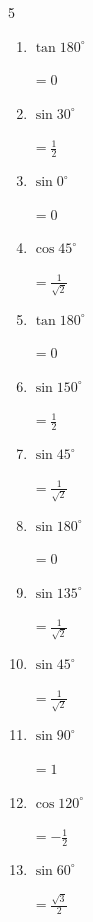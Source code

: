 \begin{multicols}{5}
\begin{enumerate}
  \item $\displaystyle \tan{180^\circ}$

        $\displaystyle =0$

  \item $\displaystyle \sin{30^\circ}$

        $\displaystyle =\frac{1}{2}$

  \item $\displaystyle \sin{0^\circ}$

        $\displaystyle =0$

  \item $\displaystyle \cos{45^\circ}$

        $\displaystyle =\frac{1}{\sqrt{2}}$

  \item $\displaystyle \tan{180^\circ}$

        $\displaystyle =0$

\columnbreak %

  \item $\displaystyle \sin{150^\circ}$

        $\displaystyle =\frac{1}{2}$

  \item $\displaystyle \sin{45^\circ}$

        $\displaystyle =\frac{1}{\sqrt{2}}$

  \item $\displaystyle \sin{180^\circ}$

        $\displaystyle =0$

  \item $\displaystyle \sin{135^\circ}$

        $\displaystyle =\frac{1}{\sqrt{2}}$

  \item $\displaystyle \sin{45^\circ}$

        $\displaystyle =\frac{1}{\sqrt{2}}$

  \item $\displaystyle \sin{90^\circ}$

        $\displaystyle =1$

  \item $\displaystyle \cos{120^\circ}$

        $\displaystyle =-\frac{1}{2}$

  \item $\displaystyle \sin{60^\circ}$

        $\displaystyle =\frac{\sqrt{3}}{2}$


\end{enumerate}
\end{multicols}
